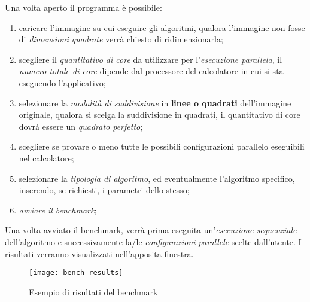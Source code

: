 Una volta aperto il programma è possibile:
\begin{enumerate}
	\item caricare l'immagine su cui eseguire gli algoritmi, qualora l'immagine non fosse di \textit{dimensioni quadrate} verrà chiesto di ridimensionarla;
	\item scegliere il \textit{quantitativo di core} da utilizzare per l'\textit{esecuzione parallela}, il \textit{numero totale di core} dipende dal processore del calcolatore in cui si sta eseguendo l'applicativo;
	\item selezionare la \textit{modalità di suddivisione} in \textbf{linee o quadrati} dell'immagine originale, qualora si scelga la suddivisione in quadrati, il quantitativo di core dovrà essere un \textit{quadrato perfetto};
	\item scegliere se provare o meno tutte le possibili configurazioni parallelo eseguibili nel calcolatore;
	\item selezionare la \textit{tipologia di algoritmo}, ed eventualmente l'algoritmo specifico, inserendo, se richiesti, i parametri dello stesso;
	\item \textit{avviare il benchmark};
\end{enumerate}	
\noindent
Una volta avviato il benchmark, verrà prima eseguita un'\textit{esecuzione sequenziale} dell'algoritmo e successivamente la/le \textit{configurazioni parallele} scelte dall'utente. I risultati verranno visualizzati nell'apposita finestra.
 \begin{figure}[H]
 	\centering
 	\texttt{[image: bench-results]}
 	\caption{Esempio di risultati del benchmark}
 \end{figure}

